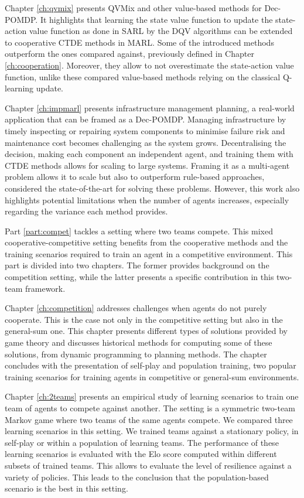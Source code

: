 Chapter \ref{ch:qvmix} presents QVMix and other value-based methods for Dec-POMDP.
It highlights that learning the state value function to update the state-action value function as done in SARL by the DQV algorithms can be extended to cooperative CTDE methods in MARL.
Some of the introduced methods outperform the ones compared against, previously defined in Chapter \ref{ch:cooperation}.
Moreover, they allow to not overestimate the state-action value function, unlike these compared value-based methods relying on the classical Q-learning update.

Chapter \ref{ch:impmarl} presents infrastructure management planning, a real-world application that can be framed as a Dec-POMDP.
Managing infrastructure by timely inspecting or repairing system components to minimise failure risk and maintenance cost becomes challenging as the system grows.
Decentralising the decision, making each component an independent agent, and training them with CTDE methods allows for scaling to large systems.
Framing it as a multi-agent problem allows it to scale but also to outperform rule-based approaches, considered the state-of-the-art for solving these problems.
However, this work also highlights potential limitations when the number of agents increases, especially regarding the variance each method provides.

Part \ref{part:compet} tackles a setting where two teams compete.
This mixed cooperative-competitive setting benefits from the cooperative methods and the training scenarios required to train an agent in a competitive environment.
This part is divided into two chapters.
The former provides background on the competition setting, while the latter presents a specific contribution in this two-team framework.

Chapter \ref{ch:competition} addresses challenges when agents do not purely cooperate.
This is the case not only in the competitive setting but also in the general-sum one.
This chapter presents different types of solutions provided by game theory and discusses historical methods for computing some of these solutions, from dynamic programming to planning methods.
The chapter concludes with the presentation of self-play and population training, two popular training scenarios for training agents in competitive or general-sum environments.

Chapter \ref{ch:2teams} presents an empirical study of learning scenarios to train one team of agents to compete against another.
The setting is a symmetric two-team Markov game where two teams of the same agents compete.
We compared three learning scenarios in this setting.
We trained teams against a stationary policy, in self-play or within a population of learning teams.
The performance of these learning scenarios is evaluated with the Elo score computed within different subsets of trained teams.
This allows to evaluate the level of resilience against a variety of policies.
This leads to the conclusion that the population-based scenario is the best in this setting.

